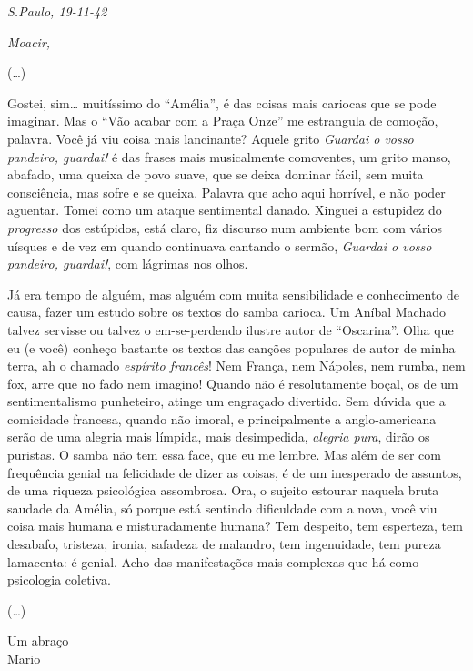 
\begin{flushright}
\textit{S.Paulo, 19-11-42}
\end{flushright}

\textit{Moacir,}

(\ldots{})

Gostei, sim\ldots{} muitíssimo do ``Amélia'', é das coisas mais cariocas
que se pode imaginar. Mas o ``Vão acabar com a Praça Onze'' me estrangula de
comoção, palavra. Você já viu coisa mais lancinante? Aquele grito
\textit{Guardai o vosso pandeiro, guardai!} é das frases mais musicalmente
comoventes, um grito manso, abafado, uma queixa de povo suave, que se
deixa dominar fácil, sem muita consciência, mas sofre e se queixa.
Palavra que acho aqui horrível, e não poder aguentar. Tomei como um
ataque sentimental danado. Xinguei a estupidez do \textit{progresso} dos
estúpidos, está claro, fiz discurso num ambiente bom com vários uísques
e de vez em quando continuava cantando o sermão, \textit{Guardai o vosso
pandeiro, guardai!}, com lágrimas nos olhos.

Já era tempo de alguém, mas alguém com muita sensibilidade e
conhecimento de causa, fazer um estudo sobre os textos do samba carioca.
Um Aníbal Machado talvez servisse ou talvez o em-se-perdendo ilustre
autor de ``Oscarina''. Olha que eu (e você) conheço bastante os
textos das canções populares de autor de minha terra, ah o chamado
\textit{espírito francês}! Nem França, nem Nápoles, nem rumba, nem fox, arre
que no fado nem imagino! Quando não é resolutamente boçal, os de um
sentimentalismo punheteiro, atinge um engraçado divertido. Sem dúvida
que a comicidade francesa, quando não imoral, e principalmente a
anglo-americana serão de uma alegria mais límpida, mais desimpedida,
\textit{alegria pura}, dirão os puristas. O samba não tem essa face, que eu me
lembre. Mas além de ser com frequência genial na felicidade de dizer as
coisas, é de um inesperado de assuntos, de uma riqueza psicológica
assombrosa. Ora, o sujeito estourar naquela bruta saudade da Amélia, só
porque está sentindo dificuldade com a nova, você viu coisa mais humana
e misturadamente humana? Tem despeito, tem esperteza, tem desabafo,
tristeza, ironia, safadeza de malandro, tem ingenuidade, tem pureza
lamacenta: é genial. Acho das manifestações mais complexas que há como
psicologia coletiva.

(\ldots{})

\begin{flushright}
Um abraço\\
Mario
\end{flushright}


